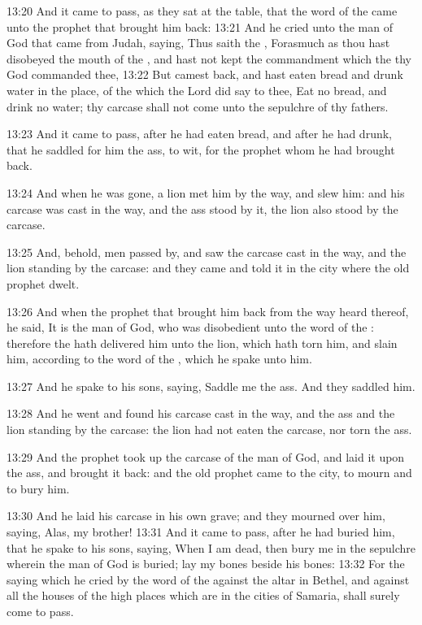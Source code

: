 13:20 And it came to pass, as they sat at the table, that the word of
the \LORD came unto the prophet that brought him back: 13:21 And he
cried unto the man of God that came from Judah, saying, Thus saith the
\LORD, Forasmuch as thou hast disobeyed the mouth of the \LORD, and hast
not kept the commandment which the \LORD thy God commanded thee, 13:22
But camest back, and hast eaten bread and drunk water in the place, of
the which the Lord did say to thee, Eat no bread, and drink no water;
thy carcase shall not come unto the sepulchre of thy fathers.

13:23 And it came to pass, after he had eaten bread, and after he had
drunk, that he saddled for him the ass, to wit, for the prophet whom
he had brought back.

13:24 And when he was gone, a lion met him by the way, and slew him:
and his carcase was cast in the way, and the ass stood by it, the lion
also stood by the carcase.

13:25 And, behold, men passed by, and saw the carcase cast in the way,
and the lion standing by the carcase: and they came and told it in the
city where the old prophet dwelt.

13:26 And when the prophet that brought him back from the way heard
thereof, he said, It is the man of God, who was disobedient unto the
word of the \LORD: therefore the \LORD hath delivered him unto the lion,
which hath torn him, and slain him, according to the word of the \LORD,
which he spake unto him.

13:27 And he spake to his sons, saying, Saddle me the ass. And they
saddled him.

13:28 And he went and found his carcase cast in the way, and the ass
and the lion standing by the carcase: the lion had not eaten the
carcase, nor torn the ass.

13:29 And the prophet took up the carcase of the man of God, and laid
it upon the ass, and brought it back: and the old prophet came to the
city, to mourn and to bury him.

13:30 And he laid his carcase in his own grave; and they mourned over
him, saying, Alas, my brother!  13:31 And it came to pass, after he
had buried him, that he spake to his sons, saying, When I am dead,
then bury me in the sepulchre wherein the man of God is buried; lay my
bones beside his bones: 13:32 For the saying which he cried by the
word of the \LORD against the altar in Bethel, and against all the
houses of the high places which are in the cities of Samaria, shall
surely come to pass.

